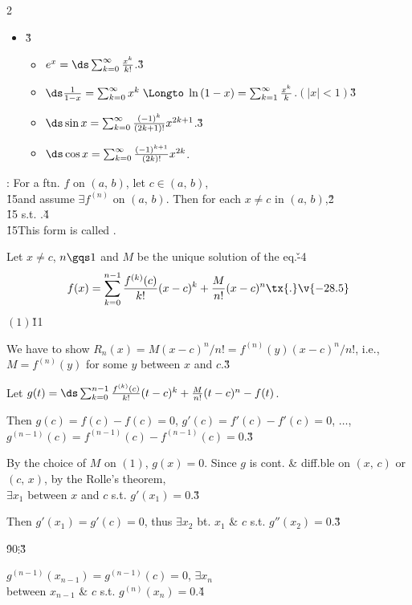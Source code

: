 \documentclass[dvipdfmx,a4paper,titlepage,9pt]{jsarticle}
\begin{document}
\begin{multicols*}{2}
\begin{itemize}[label={-}]
\item{}\v3
\begin{itemize}[label=\Cdot]
\setlength{\leftskip}{-10pt}
\item $e^x=\ds\sum_{k=0}^\infty\frac{x^k}{k!}$.\v3
\item $\ds\frac1{1-x}=\sum_{k=0}^\infty x^k\;\Longto\;\ln{}(1-x)=\sum_{k=1}^\infty\frac{x^k}k$.\quad$(|x|<1)$\v3
\item $\ds\sin x=\sum_{k=0}^\infty\frac{(-1)^k}{(2k+1)!}x^{2k+1}$.\v3
\item $\ds\cos x=\sum_{k=0}^\infty\frac{(-1)^{k+1}}{(2k)!}x^{2k}$.
\end{itemize}
\end{itemize}

\vfill\null\columnbreak


: For a ftn. $f$ on $(a,\,b)$, let $c\in(a,\,b)$,\\
\h{15}and assume $\exists f^{(n)}$ on $(a,\,b)$. Then for each $x\neq c$ in $(a,\,b)$,\v2\\
\h{15} s.t. .\v4\\
\h{15}This form is called .

\begin{Pfbox}
Let $x\neq c$, $n\gqs 1$ and $M$ be the unique solution of the eq.\v{-4}
$$f(x)=\sum_{k=0}^{n-1}\frac{f^{(k)}(c)}{k!}(x-c)^k+\frac M{n!}(x-c)^n\tx{.}\v{-28.5}$$
\hfill$(1)$\v{11}

We have to show $R_n(x)=M(x-c)^n/n!=f^{(n)}(y)(x-c)^n/n!$, i.e., $M=f^{(n)}(y)$ for some $y$ between $x$ and $c$.\v3

Let $g(t)=\ds\sum_{k=0}^{n-1}\frac{f^{(k)}(c)}{k!}(t-c)^k+\frac M{n!}(t-c)^n-f(t)$.

Then $g(c)=f(c)-f(c)=0$, $g'(c)=f'(c)-f'(c)=0$, $\ldots$,\\
$g^{(n-1)}(c)=f^{(n-1)}(c)-f^{(n-1)}(c)=0$.\v3

By the choice of $M$ on $(1)$, $g(x)=0$. Since $g$ is cont. \& diff.ble on $(x,\,c)$ or $(c,\,x)$, by the Rolle's theorem,\\
$\exists x_1$ between $x$ and $c$ s.t. $g'(x_1)=0$.\v3

Then $g'(x_1)=g'(c)=0$, thus $\exists x_2$ bt. $x_1$ \& $c$ s.t. $g''(x_2)=0$.\v3

\h{90}$\vdots$\v3

$g^{(n-1)}(x_{n-1})=g^{(n-1)}(c)=0$, $\exists x_n$\\
between $x_{n-1}$ \& $c$ s.t. $g^{(n)}(x_n)=0$.\v4


\end{Pfbox}
\end{multicols*}
\end{document}
